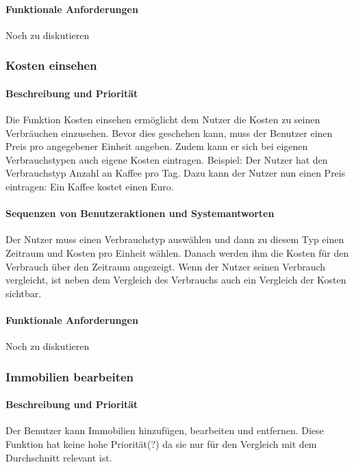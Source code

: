 \paragraph{Funktionale Anforderungen}
Noch zu diskutieren

\subsubsection{Kosten einsehen}
\paragraph{Beschreibung und Priorität}
Die Funktion Kosten einsehen ermöglicht dem Nutzer die Kosten zu seinen Verbräuchen einzusehen. Bevor dies geschehen kann, muss der Benutzer einen Preis pro angegebener Einheit angeben. Zudem kann er sich bei eigenen Verbrauchstypen auch eigene Kosten eintragen. Beispiel: Der Nutzer hat den Verbrauchstyp Anzahl an Kaffee pro Tag. Dazu kann der Nutzer nun einen Preis eintragen: Ein Kaffee kostet einen Euro.
\paragraph{Sequenzen von Benutzeraktionen und Systemantworten}
Der Nutzer muss einen Verbrauchstyp auswählen und dann zu diesem Typ einen Zeitraum und Kosten pro Einheit wählen. Danach werden ihm die Kosten für den Verbrauch über den Zeitraum angezeigt. Wenn der Nutzer seinen Verbrauch vergleicht, ist neben dem Vergleich des Verbrauchs auch ein Vergleich der Kosten sichtbar.
\paragraph{Funktionale Anforderungen}
Noch zu diskutieren

\subsubsection{Immobilien bearbeiten}
\paragraph{Beschreibung und Priorität}
Der Benutzer kann Immobilien hinzufügen,
bearbeiten und entfernen. %
Diese Funktion hat keine hohe Priorität(?) da sie nur für den Vergleich mit dem Durchschnitt relevant ist. %
